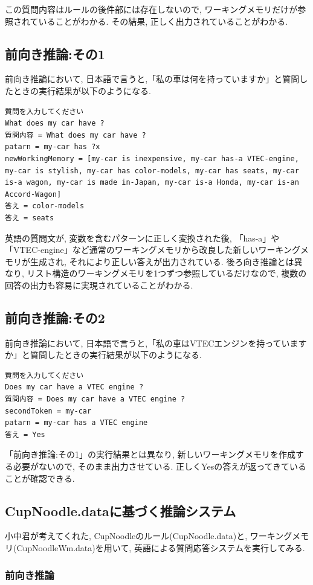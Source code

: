 \documentclass[uplatex,12pt]{jsarticle}
\begin{document}
この質問内容はルールの後件部には存在しないので, ワーキングメモリだけが参照されていることがわかる. その結果, 正しく出力されていることがわかる.

\subsection{前向き推論:その1}
前向き推論において, 日本語で言うと,「私の車は何を持っていますか」と質問したときの実行結果が以下のようになる.
\begin{lstlisting}
質問を入力してください
What does my car have ?
質問内容 = What does my car have ?
patarn = my-car has ?x
newWorkingMemory = [my-car is inexpensive, my-car has-a VTEC-engine, my-car is stylish, my-car has color-models, my-car has seats, my-car is-a wagon, my-car is made in-Japan, my-car is-a Honda, my-car is-an Accord-Wagon]
答え = color-models
答え = seats
\end{lstlisting}
英語の質問文が, 変数を含むパターンに正しく変換された後, 「has-a」や「VTEC-engine」など通常のワーキングメモリから改良した新しいワーキングメモリが生成され, それにより正しい答えが出力されている. 後ろ向き推論とは異なり, リスト構造のワーキングメモリを1つずつ参照しているだけなので, 複数の回答の出力も容易に実現されていることがわかる. 

\subsection{前向き推論:その2}
前向き推論において, 日本語で言うと,「私の車はVTECエンジンを持っていますか」と質問したときの実行結果が以下のようになる.
\begin{lstlisting}
質問を入力してください
Does my car have a VTEC engine ?
質問内容 = Does my car have a VTEC engine ?
secondToken = my-car
patarn = my-car has a VTEC engine
答え = Yes
\end{lstlisting}
「前向き推論:その1」の実行結果とは異なり, 新しいワーキングメモリを作成する必要がないので, そのまま出力させている. 正しくYesの答えが返ってきていることが確認できる.

\subsection{CupNoodle.dataに基づく推論システム}
小中君が考えてくれた, CupNoodleのルール(CupNoodle.data)と, ワーキングメモリ(CupNoodleWm.data)を用いて, 英語による質問応答システムを実行してみる.

\subsubsection{前向き推論}
\end{document}
